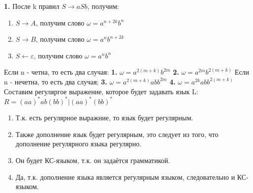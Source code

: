 \documentclass[a4paper,14pt]{article} %
\begin{document}
\textbf{1.} После k правил $S \longrightarrow aSb$, получим:
\begin{enumerate}
    \item $S \longrightarrow A$, получим слово $\omega = a^{n+2k}b^n$
    \item $S \longrightarrow B$, получим слово $\omega = a^nb^{n+2k}$
    \item $S \longleftarrow \varepsilon$, получим слово $\omega = a^nb^n$
\end{enumerate}
Если n - четна, то есть два случая:
\newline
\textbf{1. } $\omega = a^{2(m+k)}b^{2m}$
\newline
\textbf{2. } $\omega = a^{2m}b^{2(m+k)}$
\newline
Если n - нечетна, то есть два случая;
\newline
\textbf{3.} $\omega = a^{2(m+k)}abb^{2m}$
\newline
\textbf{4.} $\omega = a^{2k}abb^{2(m+k)}$
\newline
Составим регуляргое выражение, которое будет задавать язык L:
\newline
$R = (aa)^*ab(bb)^*|(aa)^*(bb)^*$

\begin{enumerate}
    \item Т.к. есть регулярное выражние, то язык будет регулярным.
    \item Также дополнение язык будет регулярным, это следует из того, что дополнение регулярного языка регулярно.
    \item Он будет КС-языком, т.к. он задаётся грамматикой.
    \item Да, т.к. дополнение языка является регулярным языком, следовательно и КС-языком.
\end{enumerate}
\end{document}
